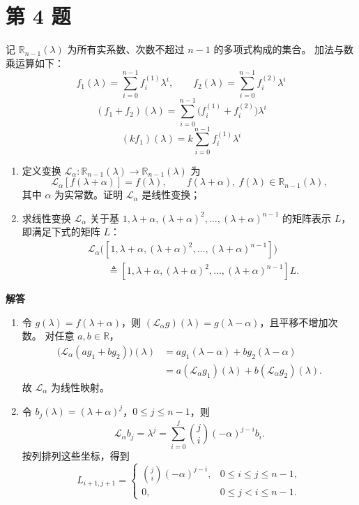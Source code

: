 \documentclass[UTF8,10pt,letterpaper,fontset=fandol]{ctexart}
\newcommand{\R}{\mathbb R}
\newcommand{\Solution}{\par\Needspace{5\baselineskip}\textbf{解答}\par}
\begin{document}
\section{第 4 题}
记 \(\R_{n-1}(\lambda)\) 为所有实系数、次数不超过 \(n-1\) 的多项式构成的集合。
加法与数乘运算如下：
\[
f_1(\lambda)=\sum_{i=0}^{n-1}f_i^{(1)}\lambda^i,\qquad
f_2(\lambda)=\sum_{i=0}^{n-1}f_i^{(2)}\lambda^i
\]
\[
(f_1+f_2)(\lambda)=\sum_{i=0}^{n-1}
\bigl(f_i^{(1)}+f_i^{(2)}\bigr)\lambda^i
\]
\[
(kf_1)(\lambda)=k\sum_{i=0}^{n-1}f_i^{(1)}\lambda^i
\]
\begin{enumerate}
\item 定义变换 \(\mathcal L_\alpha:\R_{n-1}(\lambda)\to\R_{n-1}(\lambda)\) 为
\[
\mathcal L_\alpha[f(\lambda+\alpha)]=f(\lambda),\qquad
f(\lambda+\alpha),\ f(\lambda)\in\R_{n-1}(\lambda),
\]
其中 \(\alpha\) 为实常数。证明 \(\mathcal L_\alpha\) 是线性变换；
\item 求线性变换 \(\mathcal L_\alpha\) 关于基
\(1,\lambda+\alpha,(\lambda+\alpha)^2,\ldots,(\lambda+\alpha)^{n-1}\)
的矩阵表示 \(L\)，即满足下式的矩阵 \(L\)：
\[
\begin{aligned}
&\mathcal L_\alpha\bigl([1,\lambda+\alpha,(\lambda+\alpha)^2,\ldots,
(\lambda+\alpha)^{n-1}]\bigr)\\
&\qquad\mathrel{\triangleq}
[1,\lambda+\alpha,(\lambda+\alpha)^2,\ldots,(\lambda+\alpha)^{n-1}]L.
\end{aligned}
\]
\end{enumerate}

\Solution
\begin{enumerate}
\item 令 \(g(\lambda)=f(\lambda+\alpha)\)，则
\((\mathcal L_\alpha g)(\lambda)=g(\lambda-\alpha)\)，且平移不增加次数。
对任意 \(a,b\in\R\)，
\[
\begin{aligned}
\bigl(\mathcal L_\alpha(ag_1+bg_2)\bigr)(\lambda)
&=ag_1(\lambda-\alpha)+bg_2(\lambda-\alpha)\\
&=a(\mathcal L_\alpha g_1)(\lambda)+b(\mathcal L_\alpha g_2)(\lambda).
\end{aligned}
\]
故 \(\mathcal L_\alpha\) 为线性映射。
\item 令 \(b_j(\lambda)=(\lambda+\alpha)^j\)，\(0\le j\le n-1\)，则
\[
\mathcal L_\alpha b_j=\lambda^j
=\sum_{i=0}^j\binom ji(-\alpha)^{j-i}b_i.
\]
按列排列这些坐标，得到
\[
\boxed{L_{i+1,j+1}=\begin{cases}
\displaystyle\binom ji(-\alpha)^{j-i},&0\le i\le j\le n-1,\\
0,&0\le j<i\le n-1.
\end{cases}}
\]
\end{enumerate}
\end{document}
